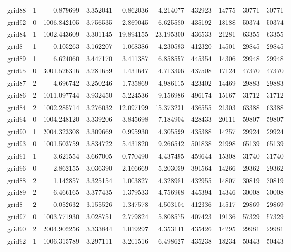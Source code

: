 \begin{longtable}{|l|r|r|r|r|r|r|r|r|r|}
grid88 & 1 & 0.879699 & 3.352041 & 0.862036 & 4.214077 & 432923 & 14775 & 30771 & 30771 \\
grid92 & 0 & 1006.842105 & 3.756535 & 2.869045 & 6.625580 & 435192 & 18188 & 50374 & 50374 \\
grid84 & 1 & 1002.443609 & 3.301145 & 19.894155 & 23.195300 & 436533 & 21281 & 63355 & 63355 \\
grid8 & 1 & 0.105263 & 3.162207 & 1.068386 & 4.230593 & 412320 & 14501 & 29845 & 29845 \\
grid89 & 1 & 6.624060 & 3.447170 & 3.411387 & 6.858557 & 445354 & 14306 & 29948 & 29948 \\
grid95 & 0 & 3001.526316 & 3.281659 & 1.431647 & 4.713306 & 437508 & 17124 & 47370 & 47370 \\
grid87 & 2 & 4.696742 & 3.250246 & 1.735869 & 4.986115 & 423402 & 14469 & 29883 & 29883 \\
grid86 & 2 & 1011.097744 & 3.932450 & 5.224536 & 9.156986 & 496174 & 15167 & 31712 & 31712 \\
grid84 & 2 & 1002.285714 & 3.276032 & 12.097199 & 15.373231 & 436555 & 21303 & 63388 & 63388 \\
grid94 & 0 & 1004.248120 & 3.339206 & 3.845698 & 7.184904 & 428433 & 20111 & 59807 & 59807 \\
grid90 & 1 & 2004.323308 & 3.309669 & 0.995930 & 4.305599 & 435388 & 14257 & 29924 & 29924 \\
grid93 & 0 & 1001.503759 & 3.834722 & 5.431820 & 9.266542 & 501838 & 21998 & 65139 & 65139 \\
grid91 & 1 & 3.621554 & 3.667005 & 0.770490 & 4.437495 & 459644 & 15308 & 31740 & 31740 \\
grid96 & 0 & 2.862155 & 3.036390 & 2.166669 & 5.203059 & 391564 & 14266 & 29362 & 29362 \\
grid88 & 2 & 1.142857 & 3.325154 & 1.003827 & 4.328981 & 432955 & 14807 & 30819 & 30819 \\
grid89 & 2 & 6.466165 & 3.377435 & 1.379533 & 4.756968 & 445394 & 14346 & 30008 & 30008 \\
grid8 & 2 & 0.052632 & 3.155526 & 1.347578 & 4.503104 & 412336 & 14517 & 29869 & 29869 \\
grid97 & 0 & 1003.771930 & 3.028751 & 2.779824 & 5.808575 & 407423 & 19136 & 57329 & 57329 \\
grid90 & 2 & 2004.902256 & 3.333844 & 1.019297 & 4.353141 & 435426 & 14295 & 29981 & 29981 \\
grid92 & 1 & 1006.315789 & 3.297111 & 3.201516 & 6.498627 & 435238 & 18234 & 50443 & 50443 \\

\end{longtable}
